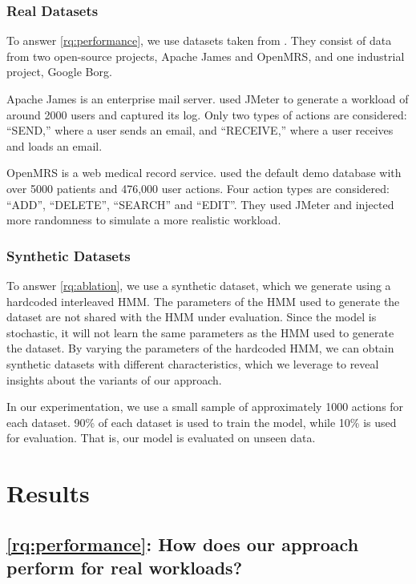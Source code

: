 \subsubsection{Real Datasets}

To answer \cref{rq:performance}, we use datasets taken from \cite{Chen2019-fu}. They consist of data from two open-source projects, Apache James and OpenMRS, and one industrial project, Google Borg.

Apache James is an enterprise mail server. \cite{Chen2019-fu} used JMeter to generate a workload of around 2000 users and captured its log. Only two types of actions are considered: ``SEND,'' where a user sends an email, and ``RECEIVE,'' where a user receives and loads an email.

OpenMRS is a web medical record service. \cite{Chen2019-fu} used the default demo database with over 5000 patients and 476,000 user actions. Four action types are considered: ``ADD'', ``DELETE'', ``SEARCH'' and ``EDIT''. They used JMeter and injected more randomness to simulate a more realistic workload.

\subsubsection{Synthetic Datasets}

To answer \cref{rq:ablation}, we use a synthetic dataset, which we generate using a hardcoded interleaved HMM. The parameters of the HMM used to generate the dataset are not shared with the HMM under evaluation. Since the model is stochastic, it will not learn the same parameters as the HMM used to generate the dataset. By varying the parameters of the hardcoded HMM, we can obtain synthetic datasets with different characteristics, which we leverage to reveal insights about the variants of our approach.

In our experimentation, we use a small sample of approximately 1000 actions for each dataset. 90\% of each dataset is used to train the model, while 10\% is used for evaluation. That is, our model is evaluated on unseen data.

\section{Results}\label{sec:results}

\subsection*{\cref{rq:performance}: How does our approach perform for real workloads?}

